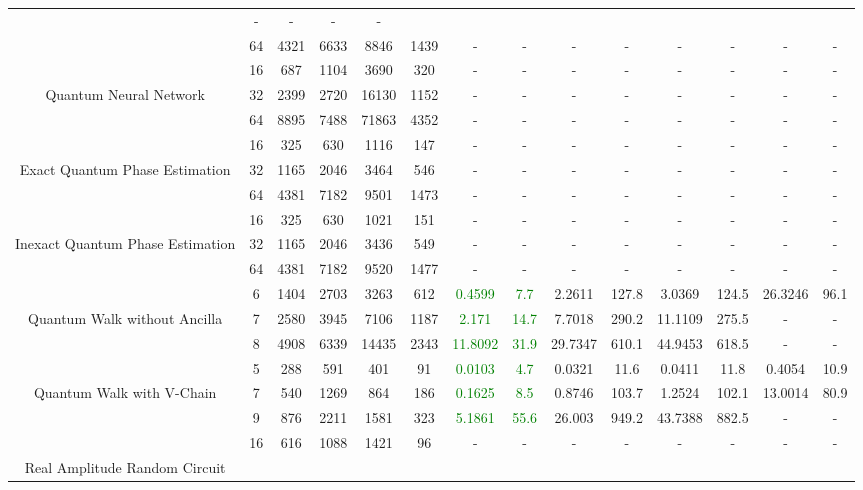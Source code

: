 \begin{table}[htb]
{\begin{tabular}{|c|c|c|c|c|c|c|c|c|c|c|c|c|c|}
 & - & -
 & - & -
 \\
 & 
64 & 4321 & 6633 & 8846 & 1439
 & - & -
 & - & -
 & - & -
 & - & -
 \\
\hline
 & 
16 & 687 & 1104 & 3690 & 320
 & - & -
 & - & -
 & - & -
 & - & -
 \\
Quantum Neural Network & 
32 & 2399 & 2720 & 16130 & 1152
 & - & -
 & - & -
 & - & -
 & - & -
 \\
 & 
64 & 8895 & 7488 & 71863 & 4352
 & - & -
 & - & -
 & - & -
 & - & -
 \\
\hline
 & 
16 & 325 & 630 & 1116 & 147
 & - & -
 & - & -
 & - & -
 & - & -
 \\
Exact Quantum Phase Estimation & 
32 & 1165 & 2046 & 3464 & 546
 & - & -
 & - & -
 & - & -
 & - & -
 \\
 & 
64 & 4381 & 7182 & 9501 & 1473
 & - & -
 & - & -
 & - & -
 & - & -
 \\
\hline
 & 
16 & 325 & 630 & 1021 & 151
 & - & -
 & - & -
 & - & -
 & - & -
 \\
Inexact Quantum Phase Estimation & 
32 & 1165 & 2046 & 3436 & 549
 & - & -
 & - & -
 & - & -
 & - & -
 \\
 & 
64 & 4381 & 7182 & 9520 & 1477
 & - & -
 & - & -
 & - & -
 & - & -
 \\
\hline
 & 
6 & 1404 & 2703 & 3263 & 612
 & \textcolor{green}{0.4599} & \textcolor{green}{7.7}
 & 2.2611 & 127.8
 & 3.0369 & 124.5
 & 26.3246 & 96.1
 \\
Quantum Walk without Ancilla & 
7 & 2580 & 3945 & 7106 & 1187
 & \textcolor{green}{2.171} & \textcolor{green}{14.7}
 & 7.7018 & 290.2
 & 11.1109 & 275.5
 & - & -
 \\
 & 
8 & 4908 & 6339 & 14435 & 2343
 & \textcolor{green}{11.8092} & \textcolor{green}{31.9}
 & 29.7347 & 610.1
 & 44.9453 & 618.5
 & - & -
 \\
\hline
 & 
5 & 288 & 591 & 401 & 91
 & \textcolor{green}{0.0103} & \textcolor{green}{4.7}
 & 0.0321 & 11.6
 & 0.0411 & 11.8
 & 0.4054 & 10.9
 \\
Quantum Walk with V-Chain & 
7 & 540 & 1269 & 864 & 186
 & \textcolor{green}{0.1625} & \textcolor{green}{8.5}
 & 0.8746 & 103.7
 & 1.2524 & 102.1
 & 13.0014 & 80.9
 \\
 & 
9 & 876 & 2211 & 1581 & 323
 & \textcolor{green}{5.1861} & \textcolor{green}{55.6}
 & 26.003 & 949.2
 & 43.7388 & 882.5
 & - & -
 \\
\hline
 & 
16 & 616 & 1088 & 1421 & 96
 & - & -
 & - & -
 & - & -
 & - & -
 \\
Real Amplitude Random Circuit & 

\end{tabular}}
\end{table}
